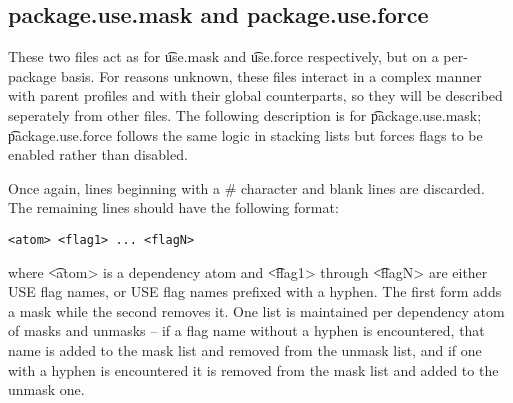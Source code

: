 \subsection{package.use.mask and package.use.force}
\label{package-use-mask-force}
These two files act as for \t{use.mask} and \t{use.force} respectively, but on a per-package basis.
For reasons unknown, these files interact in a complex manner with parent profiles and with their
global counterparts, so they will be described seperately from other files. The following
description is for \t{package.use.mask}; \t{package.use.force} follows the same logic in stacking
lists but forces flags to be enabled rather than disabled.

Once again, lines beginning with a \# character and blank lines are discarded. The remaining lines
should have the following format:
\begin{verbatim}
<atom> <flag1> ... <flagN>
\end{verbatim}
where \t{<atom>} is a dependency atom and \t{<flag1>} through \t{<flagN>} are either USE flag names,
or USE flag names prefixed with a hyphen. The first form adds a mask while the second removes it.
One list is maintained per dependency atom of masks and unmasks -- if a flag name without a
hyphen is encountered, that name is added to the mask list and removed from the unmask list, and if
one with a hyphen is encountered it is removed from the mask list and added to the unmask one.

